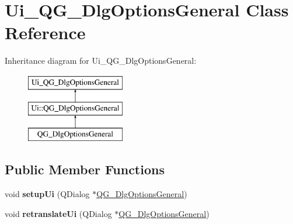 \hypertarget{classUi__QG__DlgOptionsGeneral}{\section{Ui\-\_\-\-Q\-G\-\_\-\-Dlg\-Options\-General Class Reference}
\label{classUi__QG__DlgOptionsGeneral}
}
Inheritance diagram for Ui\-\_\-\-Q\-G\-\_\-\-Dlg\-Options\-General\-:\begin{figure}[H]
\begin{center}
\leavevmode
\includegraphics[height=3.000000cm]{classUi__QG__DlgOptionsGeneral}
\end{center}
\end{figure}
\subsection*{Public Member Functions}
\begin{DoxyCompactItemize}
\item 
\hypertarget{classUi__QG__DlgOptionsGeneral_a097e8b914c266cfd2f7d38efd5d846f9}{void {\bfseries setup\-Ui} (Q\-Dialog $\ast$\hyperlink{classQG__DlgOptionsGeneral}{Q\-G\-\_\-\-Dlg\-Options\-General})}\label{classUi__QG__DlgOptionsGeneral_a097e8b914c266cfd2f7d38efd5d846f9}

\item 
\hypertarget{classUi__QG__DlgOptionsGeneral_a6eaf9bd77ee1cee32e3b9ad72622a476}{void {\bfseries retranslate\-Ui} (Q\-Dialog $\ast$\hyperlink{classQG__DlgOptionsGeneral}{Q\-G\-\_\-\-Dlg\-Options\-General})}\label{classUi__QG__DlgOptionsGeneral_a6eaf9bd77ee1cee32e3b9ad72622a476}

\end{DoxyCompactItemize}
